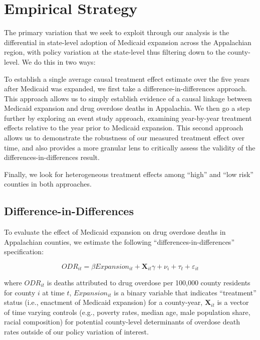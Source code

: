 \documentclass[
  11pt,
]{article}
\begin{document}
\medspace

\hypertarget{empirical-strategy}{%
\section{Empirical Strategy}\label{empirical-strategy}}

The primary variation that we seek to exploit through our analysis is
the differential in state-level adoption of Medicaid expansion across
the Appalachian region, with policy variation at the state-level thus
filtering down to the county-level. We do this in two ways:

To establish a single average causal treatment effect estimate over the
five years after Medicaid was expanded, we first take a
difference-in-differences approach. This approach allows us to simply
establish evidence of a causal linkage between Medicaid expansion and
drug overdose deaths in Appalachia. We then go a step further by
exploring an event study approach, examining year-by-year treatment
effects relative to the year prior to Medicaid expansion. This second
approach allows us to demonstrate the robustness of our measured
treatment effect over time, and also provides a more granular lens to
critically assess the validity of the differences-in-differences result.

Finally, we look for heterogeneous treatment effects among ``high'' and
``low risk'' counties in both approaches.

\hypertarget{difference-in-differences}{%
\subsection{Difference-in-Differences}\label{difference-in-differences}}

To evaluate the effect of Medicaid expansion on drug overdose deaths in
Appalachian counties, we estimate the following
``differences-in-differences'' specification:

\[ODR_{it} = \beta Expansion_{it} + \textbf{X}_{it} \gamma + \nu_{i} + \tau_{t} + \varepsilon_{it}\]

where \(ODR_{it}\) is deaths attributed to drug overdose per 100,000
county residents for county \(i\) at time \(t\), \(Expansion_{it}\) is a
binary variable that indicates ``treatment'' status (i.e., enactment of
Medicaid expansion) for a county-year, \(\textbf{X}_{it}\) is a vector
of time varying controls (e.g., poverty rates, median age, male
population share, racial composition) for potential county-level
determinants of overdose death rates outside of our policy variation of
interest.
\end{document}
